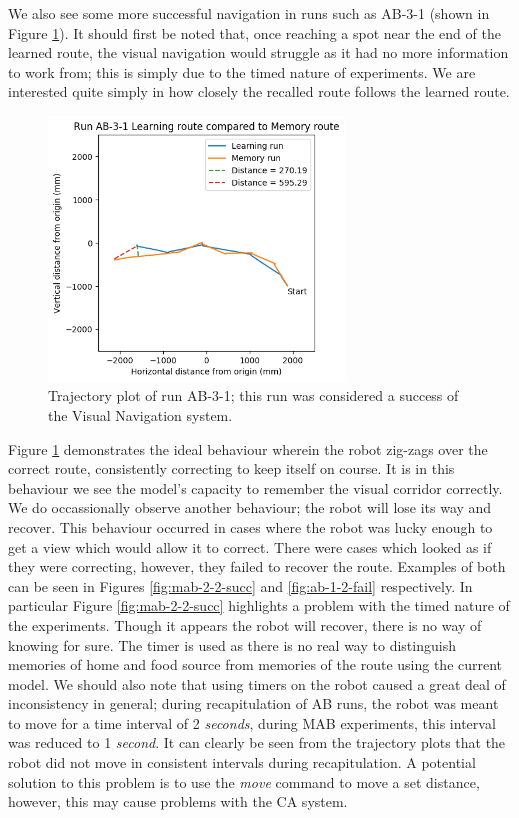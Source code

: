 \documentclass[a4paper,11pt,twoside,openright]{article}
\begin{document}
We also see some more successful navigation in runs such as AB-3-1 (shown in Figure \ref{fig:ab-3-1-succ}). It should first be
noted that, once reaching a spot near the end of the learned route, the visual navigation would struggle as it had no
more information to work from; this is simply due to the timed nature of experiments. We are interested quite simply in how
closely the recalled route follows the learned route. 

\begin{figure}
 \centering
  \includegraphics[width=0.7\textwidth]{AB-3-1}
  \caption{
    \label{fig:ab-3-1-succ} Trajectory plot of run AB-3-1; this run was considered a success of the Visual Navigation
    system.
  }
\end{figure}

Figure \ref{fig:ab-3-1-succ} demonstrates the ideal behaviour wherein the robot zig-zags over the correct route, consistently
correcting to keep itself on course. It is in this behaviour we see the model's capacity to remember the visual corridor
correctly. We do occassionally observe another behaviour; the robot will lose its way and recover. This behaviour occurred in
cases where the robot was lucky enough to get a view which would allow it to correct. There were cases which looked as if
they were correcting, however, they failed to recover the route. Examples of both can be seen in Figures \ref{fig:mab-2-2-succ}
and \ref{fig:ab-1-2-fail} respectively. In particular Figure \ref{fig:mab-2-2-succ} highlights a problem with the timed
nature of the experiments. Though it appears the robot will recover, there is no way of knowing for sure.
The timer is used as there is no real way to distinguish memories of home and food source from memories of the route using
the current model. We should also note that using timers on the robot caused a great deal of inconsistency in general; during
recapitulation of AB runs, the robot was meant to move for a time interval of 2 \textit{seconds}, during MAB experiments, this
interval was reduced to 1 \textit{second}. It can clearly be seen from the trajectory plots that the robot did not move in
consistent intervals during recapitulation. A potential solution to this problem is to use the \textit{move} command to
move a set distance, however, this may cause problems with the CA system.
\end{document}
